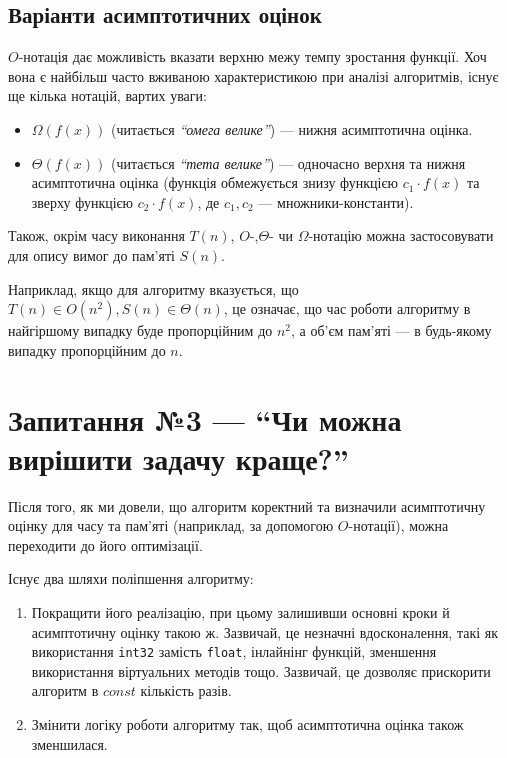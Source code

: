 \documentclass[12pt,a4paper]{report}
\begin{document}
\subsection*{Варіанти асимптотичних оцінок}

\(O\)-нотація дає можливість вказати верхню межу темпу зростання функції.
Хоч вона є найбільш часто вживаною характеристикою при аналізі алгоритмів, існує ще кілька нотацій, вартих уваги:

\begin{itemize}
    \item \(\Omega(f(x))\) (читається {\itshape ``омега велике''}) --- нижня асимптотична оцінка.
    \item \(\Theta(f(x))\) (читається {\itshape ``тета велике''}) --- одночасно верхня та нижня асимптотична оцінка (функція обмежується знизу функцією \(c_1 \cdot f(x)\) та зверху функцією \(c_2 \cdot f(x)\), де \(c_1, c_2\) --- множники-константи).
\end{itemize}

Також, окрім часу виконання \(T(n)\), \(O\)-,\(\Theta\)- чи \(\Omega\)-нотацію можна застосовувати для опису вимог до пам’яті \(S(n)\).

Наприклад, якщо для алгоритму вказується, що \(T(n) \in O(n^2), S(n) \in \Theta(n)\), це означає, що час роботи алгоритму в найгіршому випадку буде пропорційним до \(n^2\), а об’єм пам’яті --- в будь-якому випадку пропорційним до \(n\).



\section{Запитання №3 --- ``Чи можна вирішити задачу краще?''}

Після того, як ми довели, що алгоритм коректний та визначили асимптотичну оцінку для часу та пам’яті (наприклад, за допомогою \(O\)-нотації), можна переходити до його оптимізації.

Існує два шляхи поліпшення алгоритму:

\begin{enumerate}
    \item Покращити його реалізацію, при цьому залишивши основні кроки й асимптотичну оцінку такою ж. Зазвичай, це незначні вдосконалення, такі як використання \texttt{int32} замість \texttt{float}, інлайнінг функцій, зменшення використання віртуальних методів тощо. Зазвичай, це дозволяє прискорити алгоритм в \(const\) кількість разів.
    \item Змінити логіку роботи алгоритму так, щоб асимптотична оцінка також зменшилася.
\end{enumerate}
\end{document}
